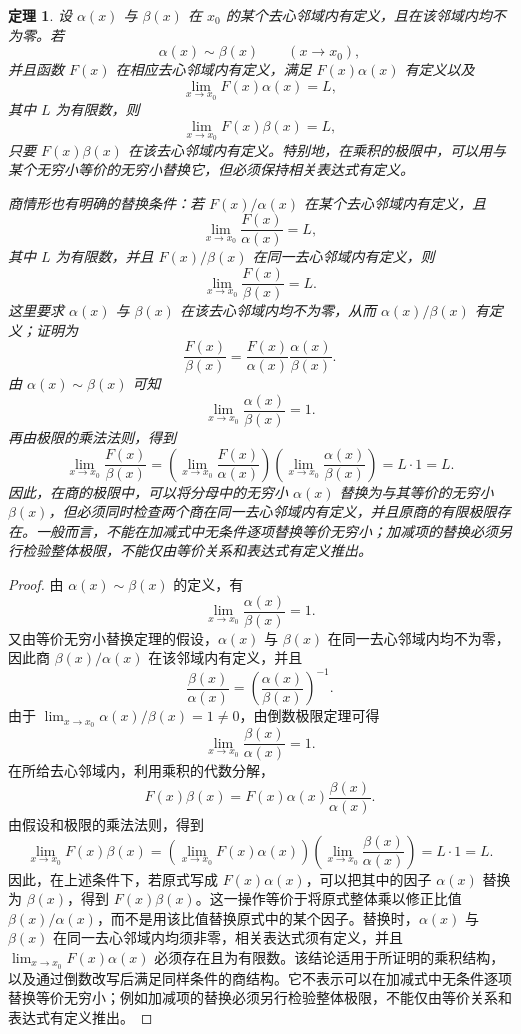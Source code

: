 \documentclass[UTF8,fontset=fandol,11pt]{ctexart}
\newtheorem{theorem}[definition]{定理}
\begin{document}
\begin{theorem}
设 $\alpha(x)$ 与 $\beta(x)$ 在 $x_0$ 的某个去心邻域内有定义，且在该邻域内均不为零。若
\[
\alpha(x)\sim\beta(x)\qquad(x\to x_0),
\]
并且函数 $F(x)$ 在相应去心邻域内有定义，满足 $F(x)\alpha(x)$ 有定义以及
\[
\lim_{x\to x_0}F(x)\alpha(x)=L,
\]
其中 $L$ 为有限数，则
\[
\lim_{x\to x_0}F(x)\beta(x)=L,
\]
只要 $F(x)\beta(x)$ 在该去心邻域内有定义。特别地，在乘积的极限中，可以用与某个无穷小等价的无穷小替换它，但必须保持相关表达式有定义。

商情形也有明确的替换条件：若 $F(x)/\alpha(x)$ 在某个去心邻域内有定义，且
\[
\lim_{x\to x_0}\frac{F(x)}{\alpha(x)}=L,
\]
其中 $L$ 为有限数，并且 $F(x)/\beta(x)$ 在同一去心邻域内有定义，则
\[
\lim_{x\to x_0}\frac{F(x)}{\beta(x)}=L.
\]
这里要求 $\alpha(x)$ 与 $\beta(x)$ 在该去心邻域内均不为零，从而 $\alpha(x)/\beta(x)$ 有定义；证明为
\[
\frac{F(x)}{\beta(x)}=\frac{F(x)}{\alpha(x)}\frac{\alpha(x)}{\beta(x)}.
\]
由 $\alpha(x)\sim\beta(x)$ 可知
\[
\lim_{x\to x_0}\frac{\alpha(x)}{\beta(x)}=1.
\]
再由极限的乘法法则，得到
\[
\lim_{x\to x_0}\frac{F(x)}{\beta(x)}
=\left(\lim_{x\to x_0}\frac{F(x)}{\alpha(x)}\right)
\left(\lim_{x\to x_0}\frac{\alpha(x)}{\beta(x)}\right)
=L\cdot1=L.
\]
因此，在商的极限中，可以将分母中的无穷小 $\alpha(x)$ 替换为与其等价的无穷小 $\beta(x)$，但必须同时检查两个商在同一去心邻域内有定义，并且原商的有限极限存在。一般而言，不能在加减式中无条件逐项替换等价无穷小；加减项的替换必须另行检验整体极限，不能仅由等价关系和表达式有定义推出。\label{thm:equivalent-substitution}
\end{theorem}
\begin{proof}
由 $\alpha(x)\sim\beta(x)$ 的定义，有
\[
\lim_{x\to x_0}\frac{\alpha(x)}{\beta(x)}=1.
\]
又由等价无穷小替换定理的假设，$\alpha(x)$ 与 $\beta(x)$ 在同一去心邻域内均不为零，因此商 $\beta(x)/\alpha(x)$ 在该邻域内有定义，并且
\[
\frac{\beta(x)}{\alpha(x)}
=\left(\frac{\alpha(x)}{\beta(x)}\right)^{-1}.
\]
由于 $\lim_{x\to x_0}\alpha(x)/\beta(x)=1\neq0$，由倒数极限定理可得
\[
\lim_{x\to x_0}\frac{\beta(x)}{\alpha(x)}=1.
\]
在所给去心邻域内，利用乘积的代数分解，
\[
F(x)\beta(x)=F(x)\alpha(x)\frac{\beta(x)}{\alpha(x)}.
\]
由假设和极限的乘法法则，得到
\[
\lim_{x\to x_0}F(x)\beta(x)
=\left(\lim_{x\to x_0}F(x)\alpha(x)\right)
\left(\lim_{x\to x_0}\frac{\beta(x)}{\alpha(x)}\right)
=L\cdot1=L.
\]
因此，在上述条件下，若原式写成 $F(x)\alpha(x)$，可以把其中的因子 $\alpha(x)$ 替换为 $\beta(x)$，得到 $F(x)\beta(x)$。这一操作等价于将原式整体乘以修正比值 $\beta(x)/\alpha(x)$，而不是用该比值替换原式中的某个因子。替换时，$\alpha(x)$ 与 $\beta(x)$ 在同一去心邻域内均须非零，相关表达式须有定义，并且 $\lim_{x\to x_0}F(x)\alpha(x)$ 必须存在且为有限数。该结论适用于所证明的乘积结构，以及通过倒数改写后满足同样条件的商结构。它不表示可以在加减式中无条件逐项替换等价无穷小；例如加减项的替换必须另行检验整体极限，不能仅由等价关系和表达式有定义推出。
\end{proof}
\end{document}

